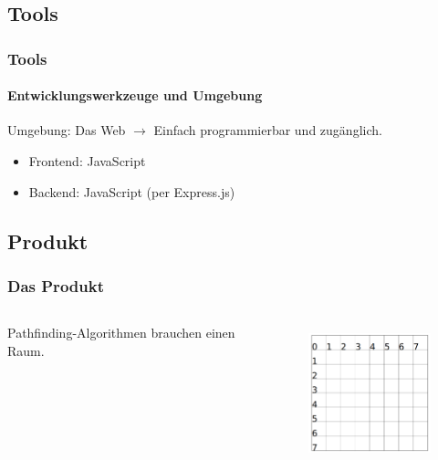 \documentclass[professionalfont,serif,german]{beamer}
\begin{document}
\begin{frame}
  \section{Tools}
  \frametitle{Tools}
  \framesubtitle{Entwicklungswerkzeuge und Umgebung}
  Umgebung: Das Web $\rightarrow$ Einfach programmierbar und zugänglich.
  \begin{itemize}
    \item Frontend: JavaScript 
    \item Backend: JavaScript (per Express.js)
  \end{itemize}
\end{frame}

\begin{frame}
  \section{Produkt}
  \frametitle{Das Produkt}
    \begin{columns}
      \begin{column}[T]{0.5\textwidth}
        Pathfinding-Algorithmen brauchen einen Raum.
      \end{column}
      \begin{column}[T]{0.5\textwidth}
        \begin{figure}
          \includegraphics[height=4cm]{img/grid1.png}
        \end{figure}
      \end{column}
    \end{columns}
\end{frame}
\end{document}
